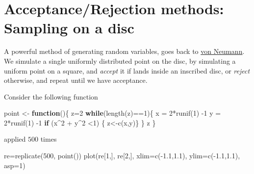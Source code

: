\documentclass[
]{article}
\newenvironment{Shaded}{\begin{snugshade}}{\end{snugshade}}
\newcommand{\AttributeTok}[1]{\textcolor[rgb]{0.77,0.63,0.00}{#1}}
\newcommand{\ControlFlowTok}[1]{\textcolor[rgb]{0.13,0.29,0.53}{\textbf{#1}}}
\newcommand{\DecValTok}[1]{\textcolor[rgb]{0.00,0.00,0.81}{#1}}
\newcommand{\FloatTok}[1]{\textcolor[rgb]{0.00,0.00,0.81}{#1}}
\newcommand{\FunctionTok}[1]{\textcolor[rgb]{0.00,0.00,0.00}{#1}}
\newcommand{\NormalTok}[1]{#1}
\newcommand{\OtherTok}[1]{\textcolor[rgb]{0.56,0.35,0.01}{#1}}
\newcommand{\SpecialCharTok}[1]{\textcolor[rgb]{0.00,0.00,0.00}{#1}}
\theoremstyle{definition}
\theoremstyle{definition}
\theoremstyle{definition}
\theoremstyle{remark}
\begin{document}
\hypertarget{acceptancerejection-methods-sampling-on-a-disc}{%
\section{Acceptance/Rejection methods: Sampling on a disc}\label{acceptancerejection-methods-sampling-on-a-disc}}

A powerful method of generating random variables, goes back to \href{https://mcnp.lanl.gov/pdf_files/nbs_vonneumann.pdf}{von Neumann}.\\
We simulate a single uniformly distributed point on the disc, by simulating a uniform point on a square, and \emph{accept} it if lands inside an inscribed disc, or \emph{reject} otherwise, and repeat until we have acceptance.

Consider the following function

\begin{Shaded}
\begin{Highlighting}[]
\NormalTok{point }\OtherTok{\textless{}{-}} \ControlFlowTok{function}\NormalTok{()\{}
\NormalTok{  z}\OtherTok{=}\DecValTok{2}
  \ControlFlowTok{while}\NormalTok{(}\FunctionTok{length}\NormalTok{(z)}\SpecialCharTok{==}\DecValTok{1}\NormalTok{)\{}
\NormalTok{  x }\OtherTok{=} \DecValTok{2}\SpecialCharTok{*}\FunctionTok{runif}\NormalTok{(}\DecValTok{1}\NormalTok{) }\SpecialCharTok{{-}}\DecValTok{1}
\NormalTok{  y }\OtherTok{=} \DecValTok{2}\SpecialCharTok{*}\FunctionTok{runif}\NormalTok{(}\DecValTok{1}\NormalTok{) }\SpecialCharTok{{-}}\DecValTok{1}
\ControlFlowTok{if}\NormalTok{ (x}\SpecialCharTok{\^{}}\DecValTok{2} \SpecialCharTok{+}\NormalTok{ y}\SpecialCharTok{\^{}}\DecValTok{2} \SpecialCharTok{\textless{}}\DecValTok{1}\NormalTok{) \{ z}\OtherTok{\textless{}{-}}\FunctionTok{c}\NormalTok{(x,y)\}}
\NormalTok{  \}}
\NormalTok{  z}
\NormalTok{\}}
\end{Highlighting}
\end{Shaded}

applied \(500\) times

\begin{Shaded}
\begin{Highlighting}[]
\NormalTok{ re}\OtherTok{=}\FunctionTok{replicate}\NormalTok{(}\DecValTok{500}\NormalTok{, }\FunctionTok{point}\NormalTok{())}
 \FunctionTok{plot}\NormalTok{(re[}\DecValTok{1}\NormalTok{,], re[}\DecValTok{2}\NormalTok{,], }\AttributeTok{xlim=}\FunctionTok{c}\NormalTok{(}\SpecialCharTok{{-}}\FloatTok{1.1}\NormalTok{,}\FloatTok{1.1}\NormalTok{), }\AttributeTok{ylim=}\FunctionTok{c}\NormalTok{(}\SpecialCharTok{{-}}\FloatTok{1.1}\NormalTok{,}\FloatTok{1.1}\NormalTok{), }\AttributeTok{asp=}\DecValTok{1}\NormalTok{)}
\end{Highlighting}
\end{Shaded}
\end{document}
